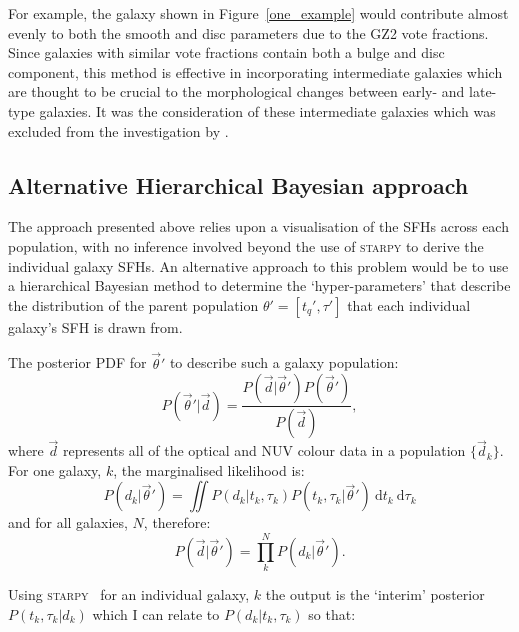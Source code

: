 For example, the galaxy shown in Figure~\ref{one_example} would contribute almost evenly to both the smooth and disc parameters due to the GZ2 vote fractions. Since galaxies with similar vote fractions contain both a bulge and disc component, this method is effective in incorporating intermediate galaxies which are thought to be crucial to the morphological changes between early- and late-type galaxies. It was the consideration of these intermediate galaxies which was excluded from the investigation by \citet{schawinski14}.

\subsection{Alternative Hierarchical Bayesian approach}\label{althyper}

The approach presented above relies upon a visualisation of the SFHs across each population, with no inference involved beyond the use of \textsc{starpy} to derive the individual galaxy SFHs. An alternative approach to this problem would be to use a hierarchical Bayesian method to determine the `hyper-parameters' that describe the distribution of the parent population $\theta' = [t_q', \tau']$ that each individual galaxy's SFH is drawn from. 

The posterior PDF for $\vec{\theta}'$ to describe such a galaxy population:
\begin{equation}\label{hyper}
P(\vec{\theta}'|\vec{d}) = \frac{P(\vec{d}|\vec{\theta}')P(\vec{\theta}')}{P(\vec{d})}, 
\end{equation}
where $\vec{d}$ represents all of the optical and NUV colour data in a population $\{\vec{d}_k\}$. For one galaxy, $k$, the marginalised likelihood is:
\begin{equation}\label{one}
P(d_k|\vec{\theta}') = \iint \! P(d_k|t_k, \tau_k) P(t_k, \tau_k|\vec{\theta}') \ \mathrm{d}t_k ~ \mathrm{d}\tau_k
\end{equation}
and for all galaxies, $N$, therefore: 
\begin{equation}
P(\vec{d}|\vec{\theta}') = \prod_k^N P(d_k|\vec{\theta}').
\end{equation}

Using \textsc{starpy}~ for an individual galaxy, $k$ the output is the `interim' posterior $P(t_k, \tau_k|d_k)$ which I can relate to $P(d_k|t_k, \tau_k)$  so that:


